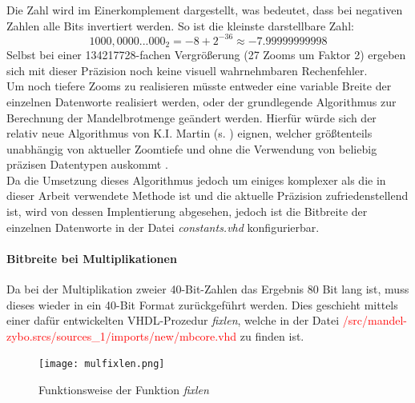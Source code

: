 \documentclass[a4paper,12pt,onesided]{report}
\begin{document}
Die Zahl wird im Einerkomplement dargestellt, was bedeutet, dass bei negativen Zahlen alle Bits invertiert werden. So ist die kleinste darstellbare Zahl:
\[1000,0000...000_2 = -8 + 2^{-36} \approx -7.99999999998 \]
Selbst bei einer 134217728-fachen Vergrößerung (27 Zooms um Faktor 2) ergeben sich mit dieser Präzision noch keine visuell wahrnehmbaren Rechenfehler.\\
Um noch tiefere Zooms zu realisieren müsste entweder eine variable Breite der einzelnen Datenworte realisiert werden, oder der grundlegende Algorithmus zur Berechnung der Mandelbrotmenge geändert werden.
Hierfür würde sich der relativ neue Algorithmus von K.I. Martin (s. \cite{SUPERFRACTALTHINGMATHS}) eignen, welcher größtenteils unabhängig von aktueller Zoomtiefe und ohne die Verwendung von beliebig präzisen Datentypen auskommt \cite{SUPERFRACTALTHINGMATHS}.\\
Da die Umsetzung dieses Algorithmus jedoch um einiges komplexer als die in dieser Arbeit verwendete Methode ist und die aktuelle Präzision zufriedenstellend ist, wird von dessen Implentierung abgesehen, jedoch ist die Bitbreite der einzelnen Datenworte in der Datei \textit{constants.vhd} konfigurierbar.\\
\paragraph{Bitbreite bei Multiplikationen}
Da bei der Multiplikation zweier 40-Bit-Zahlen das Ergebnis 80 Bit lang ist, muss dieses wieder in ein 40-Bit Format zurückgeführt werden.
Dies geschieht mittels einer dafür entwickelten VHDL-Prozedur \textit{fixlen}, welche in der Datei \textcolor{red}{/src/mandel-zybo.srcs/sources\_1/imports/new/mbcore.vhd} zu finden ist.

\begin{figure}[H]
	\centering
	\texttt{[image: mulfixlen.png]}
	\caption{Funktionsweise der Funktion \textit{fixlen}}
	\label{fig:fixlen}
\end{figure}
\end{document}

